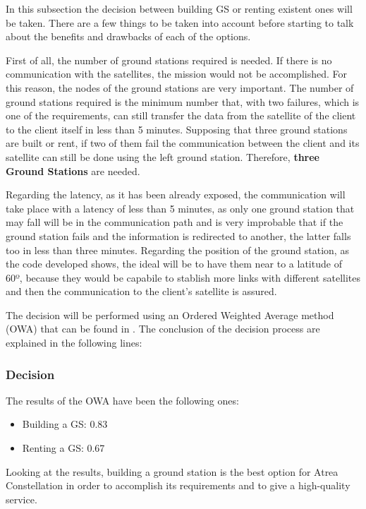 In this subsection the decision between building GS or renting existent ones will be taken. There are a few things to be taken into account before starting to talk about the benefits and drawbacks of each of the options.

First of all, the number of ground stations required is needed. If there is no communication with the satellites, the mission would not be accomplished. For this reason, the nodes of the ground stations are very important. The number of ground stations required is the minimum number that, with two failures, which is one of the requirements, can still transfer the data from the satellite of the client to the client itself in less than 5 minutes. Supposing that three ground stations are built or rent, if two of them fail the communication between the client and its satellite can still be done using the left ground station. Therefore, \textbf{three Ground Stations} are needed.

Regarding the latency, as it has been already exposed, the communication will take place with a latency of less than 5 minutes, as only one ground station that may fall will be in the communication path and is very improbable that if the ground station fails and the information is redirected to another, the latter falls too in less than three minutes. Regarding the position of the ground station, as the code developed shows, the ideal will be to have them near to a latitude of 60º, because they would be capabile to stablish more links with different satellites and then the communication to the client's satellite is assured.

The decision will be performed using an Ordered Weighted Average method (OWA) that can be found in \cite[Chapter 3, Section 5]{annex3}. The conclusion of the decision process are explained in the following lines:

\subsubsection{Decision}
The results of the OWA have been the following ones:
\begin{itemize}
\item Building a GS: 0.83
\item Renting a GS: 0.67
\end{itemize}

Looking at the results, building a ground station is the best option for Atrea Constellation in order to accomplish its requirements and to give a high-quality service.
